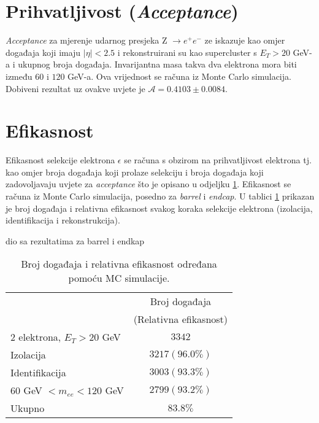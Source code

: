 \documentclass[a4paper,12pt]{report}
\begin{document}
\section{Prihvatljivost (\textit{Acceptance})}
\label{acceptance}
\textit{Acceptance} za mjerenje udarnog presjeka Z $\rightarrow e^+e^-$ ze iskazuje kao omjer događaja koji imaju $|\eta| < 2.5$ i rekonstruirani su kao supercluster s $E_T > 20$ GeV-a i ukupnog broja događaja. Invarijantna masa takva dva elektrona mora biti između $60$ i $120$ GeV-a. Ova vrijednost se računa iz Monte Carlo simulacija. Dobiveni rezultat uz ovakve uvjete je $\mathcal{A}=0.4103 \pm 0.0084$.

\section{Efikasnost}
Efikasnost selekcije elektrona $\epsilon$ se računa s obzirom na prihvatljivost elektrona tj. kao omjer broja događaja koji prolaze selekciju i broja događaja koji zadovoljavaju uvjete za \textit{acceptance} što je opisano u odjeljku \ref{acceptance}. Efikasnost se računa iz Monte Carlo simulacija, posedno za \textit{barrel} i \textit{endcap}. U tablici \ref{tab:releff} prikazan je broj događaja i relativna efikasnost svakog koraka selekcije elektrona (izolacija, identifikacija i rekonstrukcija).

dio sa rezultatima za barrel i endkap

\begin{table}[h!]
\centering
 \begin{tabular}[width=\columnwidth]{l c}
  \hline
  \hline
    & Broj događaja \\ & (Relativna efikasnost) \\
  \hline
  2 elektrona, $E_T > 20$ GeV & $3342$ \\
  Izolacija & $3217 (96.0\%)$ \\
  Identifikacija & $3003 (93.3\%)$ \\
  $60$ GeV $< m_{ee} < 120$ GeV & $2799 (93.2\%)$ \\
\hline
  Ukupno & $83.8 \%$\\
\hline
\hline
 \end{tabular}
\caption{Broj događaja i relativna efikasnost određana pomoću MC simulacije.}
\label{tab:releff}
\end{table}
\end{document}
